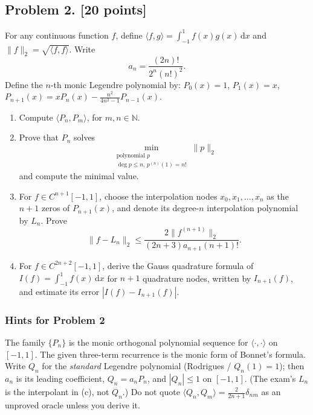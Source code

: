 \documentclass[11pt,a4paper]{article}
\begin{document}
\subsection{Problem 2. [20 points]}
For any continuous function \(f\), define \(\langle f, g \rangle = \int_{-1}^{1} f(x)g(x)\,\mathrm{d}x\) and \(\|f\|_2 = \sqrt{\langle f, f \rangle}\). Write
\[
a_{n}=\frac{(2n)!}{2^{n}(n!)^{2}}.
\]
Define the \(n\)-th monic Legendre polynomial by: \(P_{0}(x)=1\), \(P_{1}(x)=x\), \(P_{n+1}(x)=xP_{n}(x)-\frac{n^{2}}{4n^{2}-1}P_{n-1}(x)\).
\begin{enumerate}[label=(\alph*)]
    \item Compute \(\langle P_{n}, P_{m} \rangle\), for \(m,n\in\mathbb{N}\).
    \item Prove that \(P_{n}\) solves
    \[
    \min_{\substack{\text{polynomial }p\\ \deg p\le n,\, p^{(n)}(1)=n!}}\|p\|_{2}
    \]
    and compute the minimal value.
    \item For \(f\in C^{n+1}[-1,1]\), choose the interpolation nodes \(x_{0},x_{1},\ldots,x_{n}\) as the \(n+1\) zeros of \(P_{n+1}(x)\), and denote its degree-\(n\) interpolation polynomial by \(L_{n}\). Prove
    \[
    \|f-L_{n}\|_{2}\le\frac{2\|f^{(n+1)}\|_{2}}{(2n+3)a_{n+1}(n+1)!}.
    \]
    \item For \(f\in C^{2n+2}[-1,1]\), derive the Gauss quadrature formula of \(I(f)=\int_{-1}^{1}f(x)\,\mathrm{d}x\) for \(n+1\) quadrature nodes, written by \(I_{n+1}(f)\), and estimate its error \(|I(f)-I_{n+1}(f)|\).
\end{enumerate}

\subsubsection{Hints for Problem 2}

The family \(\{P_n\}\) is the monic orthogonal polynomial sequence for \(\langle\cdot,\cdot\rangle\) on \([-1,1]\). The given three-term recurrence is the monic form of Bonnet's formula. Write \(Q_n\) for the \emph{standard} Legendre polynomial (Rodrigues / \(Q_n(1)=1\)); then \(a_n\) is its leading coefficient, \(Q_n=a_n P_n\), and \(|Q_n|\le 1\) on \([-1,1]\). (The exam's \(L_n\) is the interpolant in (c), not \(Q_n\).) Do not quote \(\langle Q_n,Q_m\rangle=\frac{2}{2n+1}\delta_{nm}\) as an unproved oracle unless you derive it.
\end{document}
